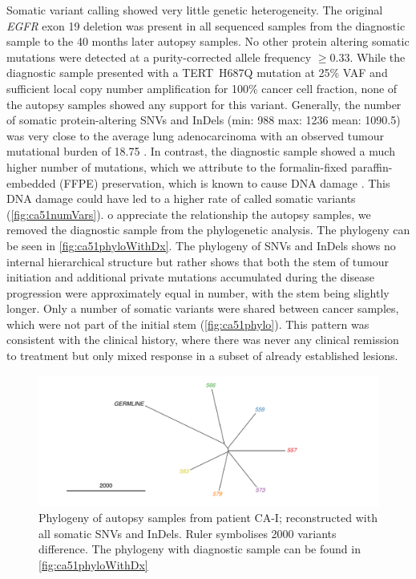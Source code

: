 Somatic variant calling showed very little genetic heterogeneity. The original \textit{EGFR} exon 19 deletion was present in all sequenced samples from the diagnostic sample to the 40 months later autopsy samples. No other protein altering somatic mutations were detected at a purity-corrected allele frequency $\geq 0.33$. While the diagnostic sample presented with a TERT~H687Q mutation at 25\% VAF and sufficient local copy number amplification for 100\% cancer cell fraction, none of the autopsy samples showed any support for this variant. Generally, the number of somatic protein-altering SNVs and InDels (min: 988 max: 1236 mean: 1090.5)  was very close to the average lung adenocarcinoma with an observed tumour mutational burden of 18.75 \cite{Alexandrov2013}. 
In contrast, the diagnostic sample showed a much higher number of mutations, which we attribute to the formalin-fixed paraffin-embedded (FFPE) preservation, which is known to cause DNA damage \cite{Do2015}. This DNA damage could have led to a higher rate of called somatic variants (\autoref{fig:ca51numVars}). o appreciate the relationship  the autopsy samples, we removed the diagnostic sample from the phylogenetic analysis. The  phylogeny can be seen in \autoref{fig:ca51phyloWithDx}. The phylogeny of SNVs and InDels shows no internal hierarchical structure but rather shows that both the stem of tumour initiation and additional private mutations accumulated during the disease progression were approximately equal in number, with the stem being slightly longer. Only a  number of somatic variants were shared between cancer samples, which were not part of the initial stem (\autoref{fig:ca51phylo}). This pattern was consistent with the clinical history, where there was never any clinical remission to treatment but only mixed response in a subset of already established lesions.

\begin{figure}[htp]
	\centering
	\includegraphics[width=.99\linewidth]{Figures/CASCADE/CA51/CA51phyloAutopsy.pdf}
	\caption[Phylogeny of autopsy samples from patient CA-I]{Phylogeny of autopsy samples from patient CA-I; reconstructed with all somatic SNVs and InDels. Ruler symbolises 2000 variants difference. The phylogeny with diagnostic sample can be found in \protect\autoref{fig:ca51phyloWithDx}} \label{fig:ca51phylo}
\end{figure}

